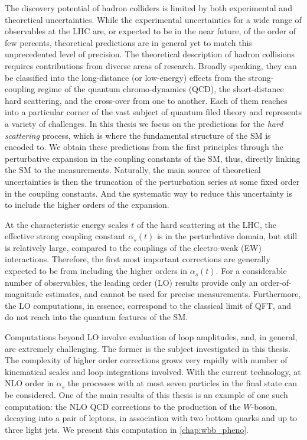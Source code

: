 The discovery potential of hadron colliders is limited by both experimental and theoretical uncertainties.
While the experimental uncertainties for a wide range of observables at the LHC are, or expected to be in the near future, of the order of few percents,
theoretical predictions are in general yet to match this unprecedented level of precision.
The theoretical description of hadron collisions requires contributions from diverse areas of research.
Broadly speaking, they can be classified into the long-distance (or low-energy) effects from 
the strong-coupling regime of the quantum chromo-dynamics (QCD), the short-distance hard scattering, and
the cross-over from one to another.
Each of them reaches into a particular corner of the vast subject of quantum filed theory and represents a variety of challenges.
In this thesis we focus on the predictions for the \emph{hard scattering} process, which is where the fundamental structure of the SM is encoded to.
We obtain these predictions from the first principles through the perturbative expansion in the coupling constants of the SM,
thus, directly linking the SM to the measurements.
Naturally, the main source of theoretical uncertainties is then the truncation
of the perturbation series at some fixed order in the coupling constants.
And the systematic way to reduce this uncertainty is to include the higher orders of the expansion.

At the characteristic energy scales $t$ of the hard scattering at the LHC, the effective strong coupling constant $\alpha_s(t)$
is in the perturbative domain, but still is relatively large, compared to the couplings of the electro-weak (EW) interactions.
Therefore, the first most important corrections are generally expected to be from including the higher orders in $\alpha_s(t)$.
For a considerable number of observables,
the leading order (LO) results provide only an order-of-magnitude estimates, and cannot be used for precise measurements.
Furthermore, the LO computations, in essence, correspond to the classical limit of QFT, and do not reach into the quantum features of the SM.

Computations beyond LO involve evaluation of loop amplitudes, and, in general, are extremely challenging.
The former is the subject investigated in this thesis.
The complexity of higher order corrections grows very rapidly with number of kinematical scales and loop integrations involved.
With the current technology, at NLO order in $\alpha_s$ the processes with at most seven particles in the final state
can be considered. One of the main results of this thesis is an example of one such computation:
the NLO QCD corrections to the production of the $W$-boson, decaying into a pair of leptons, in association with 
two bottom quarks and up to three light jets. We present this computation in \cref{chap:wbb_pheno}.

